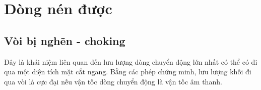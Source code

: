 \documentclass[DONG_CHAY_NEN_DUOC.tex]{subfiles}
\begin{document}
\chapter{Dòng nén được}

\section{Vòi bị nghẽn - choking}

Đây là khái niệm liên quan đến lưu lượng dòng chuyển động lớn nhất có thể có đi qua một diện tích mặt cắt ngang. Bằng các phép chứng minh, lưu lượng khối đi qua vòi là cực đại nếu vận tốc dòng chuyển động là vận tốc âm thanh.








	
\end{document}
